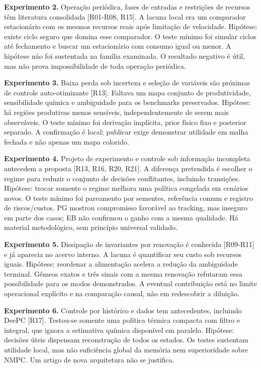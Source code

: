 \documentclass[
  11pt,
  letterpaper,
]{article}
\begin{document}
\textbf{Experimento 2.} Operação periódica, fases de entradas e
restrições de recursos têm literatura consolidada {[}R01-R08, R15{]}. A
lacuna local era um comparador estacionário com os mesmos recursos reais
após limitação de velocidade. Hipótese: existe ciclo seguro que domina
esse comparador. O teste mínimo foi simular ciclos até fechamento e
buscar um estacionário com consumo igual ou menor. A hipótese não foi
sustentada na família examinada. O resultado negativo é útil, mas não
prova impossibilidade de toda operação periódica.

\textbf{Experimento 3.} Baixa perda sob incerteza e seleção de variáveis
são próximas de controle auto-otimizante {[}R13{]}. Faltava um mapa
conjunto de produtividade, sensibilidade química e ambiguidade para os
benchmarks preservados. Hipótese: há regiões produtivas menos sensíveis,
independentemente de serem mais observáveis. O teste mínimo foi
derivação implícita, prior físico fixo e posterior separado. A
confirmação é local; publicar exige demonstrar utilidade em malha
fechada e não apenas um mapa colorido.

\textbf{Experimento 4.} Projeto de experimento e controle sob informação
incompleta antecedem a proposta {[}R13, R16, R20, R21{]}. A diferença
pretendida é escolher o regime para reduzir o conjunto de decisões
conflitantes, incluindo transições. Hipótese: trocar somente o regime
melhora uma política congelada em cenários novos. O teste mínimo foi
pareamento por sementes, referência comum e registro de riscos/custos.
PG mostrou compromisso favorável ao tracking, mas inseguro em parte dos
casos; EB não confirmou o ganho com a mesma qualidade. Há material
metodológico, sem princípio universal validado.

\textbf{Experimento 5.} Dissipação de invariantes por renovação é
conhecida {[}R09-R11{]} e já aparecia no acervo interno. A lacuna é
quantificar seu custo sob recursos iguais. Hipótese: reordenar a
alimentação acelera a redução da ambiguidade terminal. Gêmeos exatos e
três sinais com a mesma renovação refutaram essa possibilidade para os
modos demonstrados. A eventual contribuição está no limite operacional
explícito e na comparação causal, não em redescobrir a diluição.

\textbf{Experimento 6.} Controle por histórico e dados tem antecedentes,
incluindo DeePC {[}R17{]}. Testou-se somente uma política térmica
compacta com filtro e integral, que ignora a estimativa química
disponível em paralelo. Hipótese: decisões úteis dispensam reconstrução
de todos os estados. Os testes sustentam utilidade local, mas não
suficiência global da memória nem superioridade sobre NMPC. Um artigo de
nova arquitetura não se justifica.
\end{document}
